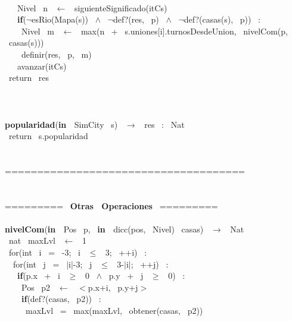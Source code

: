 \\\indent \ \indent \ \indent \ Nivel \ n \ $\leftarrow$ \ siguienteSignificado(itCs)
\\\indent \ \indent \ \indent \ \textbf{if}($\neg$esRio(Mapa(s)) \ $\wedge$ \ $\neg$def?(res, \ p) \ $\wedge$ \ $\neg$def?(casas(s), \ p)) \ :
\\\indent \ \indent \ \indent \ \indent \ Nivel \ m \ $\leftarrow$ \ max(n \ + \ s.uniones[i].turnosDesdeUnion, \ nivelCom(p, \ casas(s)))
\\\indent \ \indent \ \indent \ \indent \ definir(res, \ p, \ m)
\\\indent \ \indent \ \indent \ avanzar(itCs)
\\\indent \ return \ res
\\\noindent\makebox[\linewidth]{\rule{\textwidth}{0.4pt}}
\\
\\\noindent\makebox[\linewidth]{\rule{\textwidth}{0.4pt}}
\\\textbf{popularidad}(\textbf{in \ }SimCity \ s) \ $\rightarrow $ \ res \ : \ Nat
\\\indent \ return \ s.popularidad
\\\noindent\makebox[\linewidth]{\rule{\textwidth}{0.4pt}}
\\
\\===================================== \ 
\\
\\
\\========= \ \textbf{Otras \ Operaciones} \ =========
\\\noindent\makebox[\linewidth]{\rule{\textwidth}{0.4pt}}
\\\textbf{nivelCom}(\textbf{in \ }Pos \ p, \ \textbf{in \ }dicc(pos, \ Nivel) \ casas) \ $\rightarrow $ \ Nat
\\\indent \ nat \ maxLvl \ $\leftarrow$ \ 1
\\\indent \ for(int \ i \ = \ -3; \ i \ $\leq$ \ 3; \ ++i) \ :
\\\indent \ \indent \ for(int \ j \ = \ $\mid$i$\mid$-3; \ j \ $\leq$ \ 3-$\mid$i$\mid$; \ ++j) \ :
\\\indent \ \indent \ \indent \ \textbf{if}(p.x \ + \ i \ $\geq$ \ 0 \ $\wedge$ \ p.y \ + \ j \ $\geq$ \ 0) \ :
\\\indent \ \indent \ \indent \ \indent \ Pos \ p2 \ $\leftarrow$ \ $<$p.x+i, \ p.y+j$>$ \ 
\\\indent \ \indent \ \indent \ \indent \ \textbf{if}(def?(casas, \ p2)) \ :
\\\indent \ \indent \ \indent \ \indent \ \indent \ maxLvl \ = \ max(maxLvl, \ obtener(casas, \ p2))

